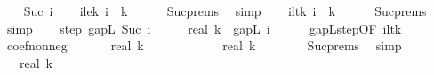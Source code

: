 \begin{isabellebody}
\isanewline
\ \ \isamarkupfalse%
\ {\isacharparenleft}{\kern0pt}Suc\ i{\isacharparenright}{\kern0pt}\isanewline
\ \ \isamarkupfalse%
\ i{\isacharunderscore}{\kern0pt}le{\isacharunderscore}{\kern0pt}k{\isacharcolon}{\kern0pt}\ {\isachardoublequoteopen}i\ {\isasymle}\ k{\isachardoublequoteclose}\isanewline
\ \ \ \ \isamarkupfalse%
\ Suc{\isachardot}{\kern0pt}prems\ \isamarkupfalse%
\ simp\isanewline
\ \ \isamarkupfalse%
\ i{\isacharunderscore}{\kern0pt}lt{\isacharunderscore}{\kern0pt}k{\isacharcolon}{\kern0pt}\ {\isachardoublequoteopen}i\ {\isacharless}{\kern0pt}\ k{\isachardoublequoteclose}\isanewline
\ \ \ \ \isamarkupfalse%
\ Suc{\isachardot}{\kern0pt}prems\ \isamarkupfalse%
\ simp\isanewline
\isanewline
\ \ \isamarkupfalse%
\ step{\isacharcolon}{\kern0pt}\ {\isachardoublequoteopen}gapL\ {\isacharparenleft}{\kern0pt}Suc\ i{\isacharparenright}{\kern0pt}\ {\isasymle}\ {\isacharparenleft}{\kern0pt}{}\ {\isacharminus}{\kern0pt}\ {}\ {\isacharslash}{\kern0pt}\ real\ k{\isacharparenright}{\kern0pt}\ {\isacharasterisk}{\kern0pt}\ gapL\ i{\isachardoublequoteclose}\isanewline
\ \ \ \ \isamarkupfalse%
\ gapL{\isacharunderscore}{\kern0pt}step{\isacharbrackleft}{\kern0pt}OF\ i{\isacharunderscore}{\kern0pt}lt{\isacharunderscore}{\kern0pt}k{\isacharbrackright}{\kern0pt}\ \isakeywordONE{{\isachardot}{\kern0pt}}\isamarkupfalse%
\isanewline
\isanewline
\ \ \isamarkupfalse%
\ coef{\isacharunderscore}{\kern0pt}nonneg{\isacharcolon}{\kern0pt}\ {\isachardoublequoteopen}{}\ {\isasymle}\ {\isacharparenleft}{\kern0pt}{}\ {\isacharminus}{\kern0pt}\ {}\ {\isacharslash}{\kern0pt}\ real\ k{\isacharparenright}{\kern0pt}{\isachardoublequoteclose}\isanewline
\ \ \isamarkupfalse%
\ {\isacharminus}{\kern0pt}\isanewline
\ \ \ \ \isamarkupfalse%
\ {\isachardoublequoteopen}{}\ {\isasymle}\ real\ k{\isachardoublequoteclose}\isanewline
\ \ \ \ \ \ \isamarkupfalse%
\ Suc{\isachardot}{\kern0pt}prems{\isacharparenleft}{\kern0pt}{}{\isacharparenright}{\kern0pt}\ \isamarkupfalse%
\ simp\isanewline
\ \ \ \ \isamarkupfalse%
\ \isamarkupfalse%
\ {\isachardoublequoteopen}{}\ {\isacharslash}{\kern0pt}\ real\ k\ {\isasymle}\ {}{\isachardoublequoteclose}\isanewline
\ \ \ \ \ \ \isamarkupfalse%

\end{isabellebody}
